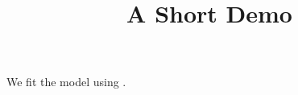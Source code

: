 \documentclass[article]{jss}
\title{A Short Demo}
\begin{document}
We fit the model using .
\end{document}
